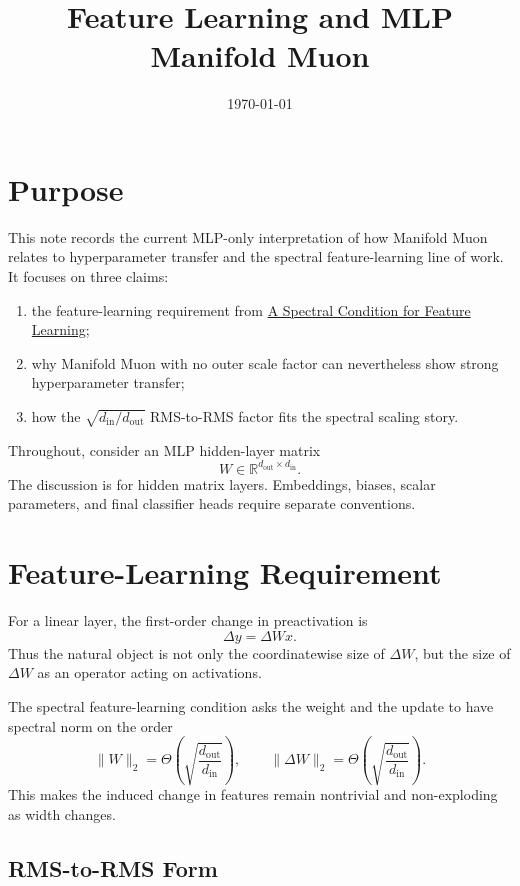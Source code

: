 \documentclass[12pt]{article}
\title{Feature Learning and MLP Manifold Muon}
\author{}
\date{\today}
\newcommand{\R}{\mathbb{R}}
\newcommand{\fanin}{d_{\mathrm{in}}}
\newcommand{\fanout}{d_{\mathrm{out}}}
\begin{document}
\maketitle

\section{Purpose}

This note records the current MLP-only interpretation of how Manifold Muon
relates to hyperparameter transfer and the spectral feature-learning line of
work. It focuses on three claims:
\begin{enumerate}
    \item the feature-learning requirement from
    \href{https://arxiv.org/abs/2310.17813}{A Spectral Condition for Feature Learning};
    \item why Manifold Muon with no outer scale factor can nevertheless show
    strong hyperparameter transfer;
    \item how the $\sqrt{\fanin/\fanout}$ RMS-to-RMS factor fits the spectral
    scaling story.
\end{enumerate}

Throughout, consider an MLP hidden-layer matrix
\[
    W \in \R^{\fanout \times \fanin}.
\]
The discussion is for hidden matrix layers. Embeddings, biases, scalar
parameters, and final classifier heads require separate conventions.

\section{Feature-Learning Requirement}

For a linear layer, the first-order change in preactivation is
\[
    \Delta y = \Delta W x.
\]
Thus the natural object is not only the coordinatewise size of $\Delta W$, but
the size of $\Delta W$ as an operator acting on activations.

The spectral feature-learning condition asks the weight and the update to have
spectral norm on the order
\[
    \|W\|_2 = \Theta\!\left(\sqrt{\frac{\fanout}{\fanin}}\right),
    \qquad
    \|\Delta W\|_2 =
    \Theta\!\left(\sqrt{\frac{\fanout}{\fanin}}\right).
\]
This makes the induced change in features remain nontrivial and non-exploding
as width changes.

\subsection{RMS-to-RMS Form}
\end{document}
